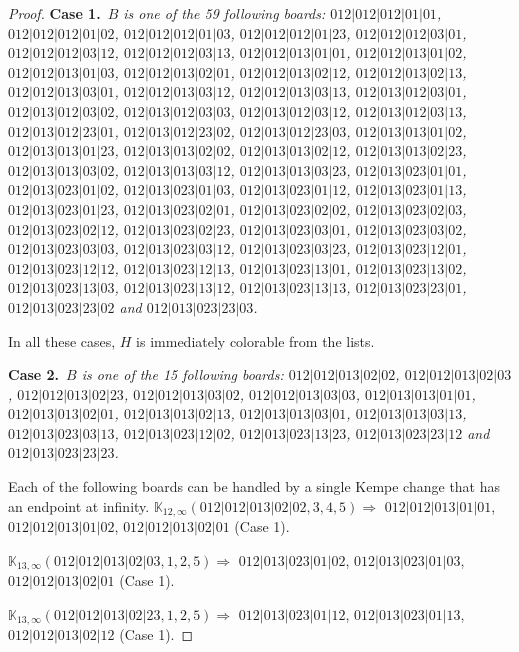\documentclass[12pt]{article}
\newcommand{\K}{\mathbb{K}}
\newcommand{\case}[2]{{\bf Case #1.}~{\it #2}~~}
\begin{document}
\begin{proof}
\bigskip
\case{1}{$B$ is one of the 59 following boards:
 $012|012|012|01|01$, $012|012|012|01|02$, $012|012|012|01|03$, $012|012|012|01|23$, $012|012|012|03|01$, $012|012|012|03|12$, $012|012|012|03|13$, $012|012|013|01|01$, $012|012|013|01|02$, $012|012|013|01|03$, $012|012|013|02|01$, $012|012|013|02|12$, $012|012|013|02|13$, $012|012|013|03|01$, $012|012|013|03|12$, $012|012|013|03|13$, $012|013|012|03|01$, $012|013|012|03|02$, $012|013|012|03|03$, $012|013|012|03|12$, $012|013|012|03|13$, $012|013|012|23|01$, $012|013|012|23|02$, $012|013|012|23|03$, $012|013|013|01|02$, $012|013|013|01|23$, $012|013|013|02|02$, $012|013|013|02|12$, $012|013|013|02|23$, $012|013|013|03|02$, $012|013|013|03|12$, $012|013|013|03|23$, $012|013|023|01|01$, $012|013|023|01|02$, $012|013|023|01|03$, $012|013|023|01|12$, $012|013|023|01|13$, $012|013|023|01|23$, $012|013|023|02|01$, $012|013|023|02|02$, $012|013|023|02|03$, $012|013|023|02|12$, $012|013|023|02|23$, $012|013|023|03|01$, $012|013|023|03|02$, $012|013|023|03|03$, $012|013|023|03|12$, $012|013|023|03|23$, $012|013|023|12|01$, $012|013|023|12|12$, $012|013|023|12|13$, $012|013|023|13|01$, $012|013|023|13|02$, $012|013|023|13|03$, $012|013|023|13|12$, $012|013|023|13|13$, $012|013|023|23|01$, $012|013|023|23|02$ and $012|013|023|23|03$.}

\bigskip

In all these cases, $H$ is immediately colorable from the lists.

\bigskip
\case{2}{$B$ is one of the 15 following boards:
 $012|012|013|02|02$, $012|012|013|02|03$, $012|012|013|02|23$, $012|012|013|03|02$, $012|012|013|03|03$, $012|013|013|01|01$, $012|013|013|02|01$, $012|013|013|02|13$, $012|013|013|03|01$, $012|013|013|03|13$, $012|013|023|03|13$, $012|013|023|12|02$, $012|013|023|13|23$, $012|013|023|23|12$ and $012|013|023|23|23$.}

\bigskip

Each of the following boards can be handled by a single Kempe change that has an endpoint at infinity.
$\K_{12,\infty}(012|012|013|02|02,3, 4, 5)\Rightarrow $ $012|012|013|01|01$, $012|012|013|01|02$, $012|012|013|02|01$ (Case 1).

\bigskip

$\K_{13,\infty}(012|012|013|02|03,1, 2, 5)\Rightarrow $ $012|013|023|01|02$, $012|013|023|01|03$, $012|012|013|02|01$ (Case 1).

\bigskip

$\K_{13,\infty}(012|012|013|02|23,1, 2, 5)\Rightarrow $ $012|013|023|01|12$, $012|013|023|01|13$, $012|012|013|02|12$ (Case 1).


\end{proof}
\end{document}
